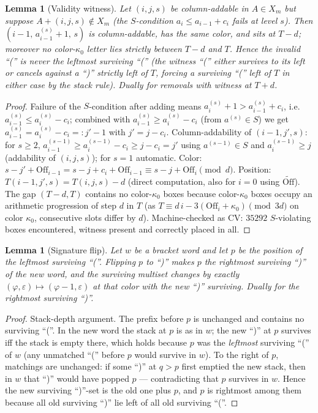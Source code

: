 \documentclass[11pt]{article}
\newtheorem{lemma}[theorem]{Lemma}
\theoremstyle{definition}
\newcommand{\Off}{\mathrm{Off}}
\newcommand{\Offe}{\widetilde{\Off}}
\newcommand{\eps}{\varepsilon}
\begin{document}
\begin{lemma}[Validity witness]\label{lem:witness}
Let $(i,j,s)$ be column-addable in $A\in X_m$ but suppose $A+(i,j,s)\notin
X_m$ (the $S$-condition $a_i\le a_{i-1}+c_i$ fails at level $s$). Then
$(i-1,\,a^{(s)}_{i-1}+1,\,s)$ is column-addable, has the \emph{same color},
and sits at $T-d$; moreover no color-$\kappa_0$ letter lies strictly between
$T-d$ and $T$. Hence the invalid ``('' is never the leftmost surviving ``(''
(the witness ``('' either survives to its left or cancels against a ``)''
strictly left of $T$, forcing a surviving ``('' left of $T$ in either case
by the stack rule). Dually for removals with witness at $T+d$.
\end{lemma}
\begin{proof}
Failure of the $S$-condition after adding means $a^{(s)}_i+1 >
a^{(s)}_{i-1}+c_i$, i.e.\ $a^{(s)}_{i-1} \le a^{(s)}_i - c_i$; combined with
$a^{(s)}_{i-1}\ge a^{(s)}_i - c_i$ (from $a^{(s)}\in S$) we get
$a^{(s)}_{i-1}=a^{(s)}_i-c_i =: j'-1$ with $j'=j-c_i$. Column-addability of
$(i-1,j',s)$: for $s\ge2$, $a^{(s-1)}_{i-1}\ge a^{(s-1)}_i - c_i \ge j-c_i =
j'$ using $a^{(s-1)}\in S$ and $a^{(s-1)}_i\ge j$ (addability of $(i,j,s)$);
for $s=1$ automatic. Color: $s-j'+\Off_{i-1} = s-j+c_i+\Off_{i-1} \equiv
s-j+\Off_i \pmod d$. Position: $T(i-1,j',s)=T(i,j,s)-d$ (direct computation,
also for $i=0$ using $\Offe$). The gap $(T-d,T)$ contains no color-$\kappa_0$
boxes because color-$\kappa_0$ boxes occupy an arithmetic progression of step
$d$ in $T$ (as $T\equiv d\,i - 3(\Off_i+\kappa_0) \pmod{3d}$ on color
$\kappa_0$, consecutive slots differ by $d$). Machine-checked as CV: $35292$
$S$-violating boxes encountered, witness present and correctly placed in all.
\end{proof}

\begin{lemma}[Signature flip]\label{lem:flip}
Let $w$ be a bracket word and let $p$ be the position of the leftmost
surviving ``(''. Flipping $p$ to ``)'' makes $p$ the rightmost surviving
``)'' of the new word, and the surviving multiset changes by exactly
$(\varphi,\eps)\mapsto(\varphi-1,\eps)$ at that color with the new ``)''
surviving. Dually for the rightmost surviving ``)''.
\end{lemma}
\begin{proof}
Stack-depth argument. The prefix before $p$ is unchanged and contains no
surviving ``(''. In the new word the stack at $p$ is as in $w$; the new ``)''
at $p$ survives iff the stack is empty there, which holds because $p$ was the
\emph{leftmost} surviving ``('' of $w$ (any unmatched ``('' before $p$ would
survive in $w$). To the right of $p$, matchings are unchanged: if some ``)''
at $q>p$ first emptied the new stack, then in $w$ that ``)'' would have popped
$p$ --- contradicting that $p$ survives in $w$. Hence the new surviving
``)''-set is the old one plus $p$, and $p$ is rightmost among them because all
old surviving ``)'' lie left of all old surviving ``(''.
\end{proof}
\end{document}
